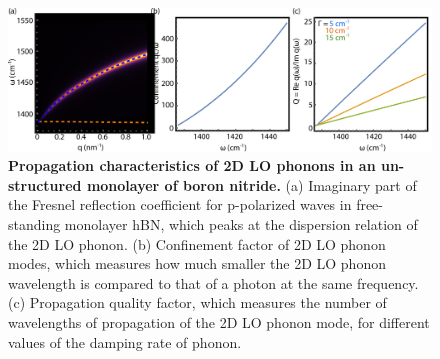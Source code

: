\documentclass[aps,prb,twocolumn,
	           groupedaddress,superscriptaddress,
               amsfonts,amssymb,amsmath,floatfix,
	           citeautoscript]{revtex4-1}
\begin{document}
\begin{figure}[t]
    \includegraphics[width=135mm]{fig2.pdf}
    \caption{%
        \textbf{Propagation characteristics of 2D LO phonons in an un-structured monolayer of boron nitride.} (a) Imaginary part of the Fresnel reflection coefficient for p-polarized waves in free-standing monolayer hBN, which peaks at the dispersion relation of the 2D LO phonon. (b) Confinement factor of 2D LO phonon modes, which measures how much smaller the 2D LO phonon wavelength is compared to that of a photon at the same frequency. (c) Propagation quality factor, which measures the number of wavelengths of propagation of the 2D LO phonon mode, for different values of the damping rate of phonon.
        \label{fig:2}
        }
\end{figure}
\end{document}
